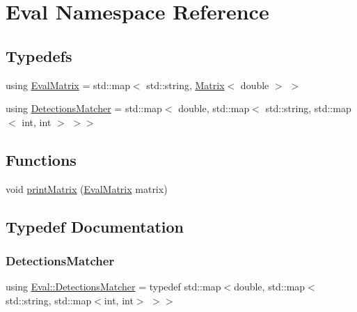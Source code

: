 \hypertarget{namespace_eval}{}\section{Eval Namespace Reference}
\label{namespace_eval}
\subsection*{Typedefs}
\begin{DoxyCompactItemize}
\item 
using \hyperlink{namespace_eval_a565709ccceb6f242086a1bab22551525}{Eval\+Matrix} = std\+::map$<$ std\+::string, \hyperlink{_matrix_8h_a30e4daca1ceec5f93cf2a1214d8dd3c9}{Matrix}$<$ double $>$ $>$
\item 
using \hyperlink{namespace_eval_a1de8386c9b3cc4b159213cd3feae152c}{Detections\+Matcher} = std\+::map$<$ double, std\+::map$<$ std\+::string, std\+::map$<$ int, int $>$ $>$$>$
\end{DoxyCompactItemize}
\subsection*{Functions}
\begin{DoxyCompactItemize}
\item 
void \hyperlink{namespace_eval_aae52ed3d7a67d74c6ffc3f4faa546c3d}{print\+Matrix} (\hyperlink{namespace_eval_a565709ccceb6f242086a1bab22551525}{Eval\+Matrix} matrix)
\end{DoxyCompactItemize}


\subsection{Typedef Documentation}
\mbox{\label{namespace_eval_a1de8386c9b3cc4b159213cd3feae152c}} 
\subsubsection{\texorpdfstring{Detections\+Matcher}{DetectionsMatcher}}
{\footnotesize\ttfamily using \hyperlink{namespace_eval_a1de8386c9b3cc4b159213cd3feae152c}{Eval\+::\+Detections\+Matcher} = typedef std\+::map$<$double, std\+::map$<$std\+::string, std\+::map$<$int, int$>$ $>$$>$}

\mbox{\label{namespace_eval_a565709ccceb6f242086a1bab22551525}} 
